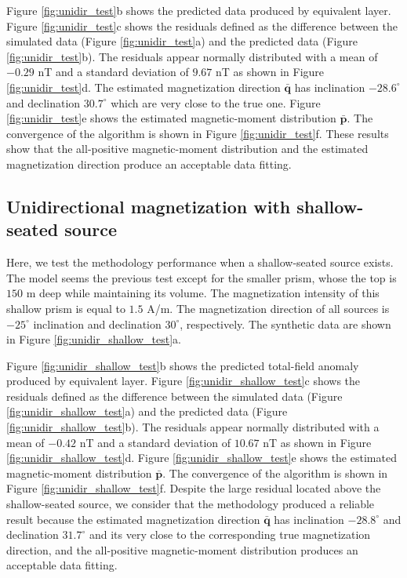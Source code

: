 Figure \ref{fig:unidir_test}b shows the predicted data produced by equivalent layer. 
Figure \ref{fig:unidir_test}c shows the residuals defined as the difference between the 
simulated data (Figure \ref{fig:unidir_test}a) and the predicted data 
(Figure \ref{fig:unidir_test}b). The residuals appear normally distributed with a mean of 
$-0.29$ nT and a standard deviation of $9.67$  nT as shown in Figure \ref{fig:unidir_test}d. 
The estimated magnetization direction $\bar{\mathbf{q}}$ has inclination $-28.6^\circ$ 
and declination $30.7^\circ$ which are very close to the true one. 
Figure \ref{fig:unidir_test}e shows the estimated magnetic-moment distribution $\bar{\mathbf{p}}$. 
The convergence of the algorithm is shown in Figure \ref{fig:unidir_test}f. These results show 
that the all-positive magnetic-moment distribution and the estimated magnetization direction 
produce an acceptable data fitting.

\subsection{Unidirectional magnetization with shallow-seated source}

Here, we test the methodology performance when a shallow-seated source exists. The model seems the previous test except for the smaller prism, whose the top is $150$ m deep while maintaining its volume. The magnetization intensity of this shallow prism is equal to $1.5$ A/m. The magnetization direction of all sources is $-25^\circ$ inclination and declination $30^\circ$, respectively. The synthetic data are shown in Figure \ref{fig:unidir_shallow_test}a.

Figure \ref{fig:unidir_shallow_test}b shows the predicted total-field anomaly produced by 
equivalent layer. Figure \ref{fig:unidir_shallow_test}c shows the residuals defined as the 
difference between the simulated data (Figure \ref{fig:unidir_shallow_test}a) and the 
predicted data (Figure \ref{fig:unidir_shallow_test}b). The residuals appear normally 
distributed with a mean of $-0.42$ nT and a standard deviation of $10.67$ nT as shown in 
Figure \ref{fig:unidir_shallow_test}d. Figure \ref{fig:unidir_shallow_test}e shows the 
estimated magnetic-moment distribution $\bar{\mathbf{p}}$. The convergence of the 
algorithm is shown in Figure \ref{fig:unidir_shallow_test}f. Despite the large residual 
located above the shallow-seated source, we consider that the methodology produced a 
reliable result because the estimated magnetization direction $\bar{\mathbf{q}}$ has 
inclination $-28.8^\circ$ and declination $31.7^\circ$ and its very close to the 
corresponding true magnetization direction, and the all-positive magnetic-moment 
distribution produces an acceptable data fitting. 

